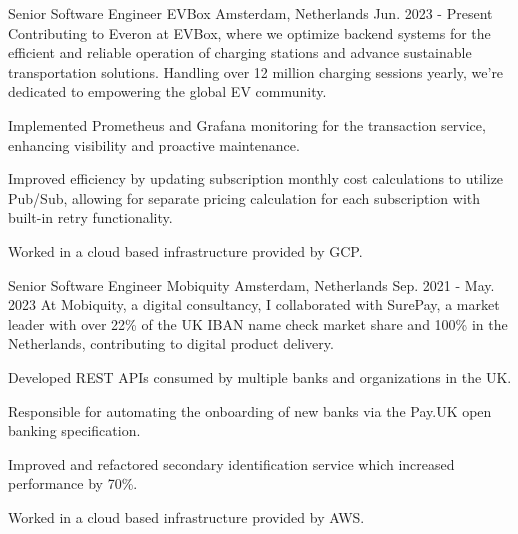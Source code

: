 

\begin{cventries}
  \cventry
  {Senior Software Engineer} %
  {EVBox} %
  {Amsterdam, Netherlands} %
  {Jun. 2023 - Present} %
  {
    Contributing to Everon at EVBox, where we optimize backend systems for the efficient and reliable operation of charging stations and advance sustainable transportation solutions. Handling over 12 million charging sessions yearly, we're dedicated to empowering the global EV community.
  }
  {
    \begin{cvitems} %
      \item {Implemented Prometheus and Grafana monitoring for the transaction service, enhancing visibility and proactive maintenance.}
      \item {Improved efficiency by updating subscription monthly cost calculations to utilize Pub/Sub, allowing for separate pricing calculation for each subscription with built-in retry functionality.}
      \item {Worked in a cloud based infrastructure provided by GCP.}
    \end{cvitems}
  }

  \cventry
    {Senior Software Engineer} %
    {Mobiquity} %
    {Amsterdam, Netherlands} %
    {Sep. 2021 - May. 2023} %
    {
      At Mobiquity, a digital consultancy, I collaborated with SurePay, a market leader with over 22\% of the UK IBAN name check market share and 100\% in the Netherlands, contributing to digital product delivery.
    }
    {
      \begin{cvitems} %
        \item {Developed REST APIs consumed by multiple banks and organizations in the UK.}
        \item {Responsible for automating the onboarding of new banks via the Pay.UK open banking specification.}
        \item {Improved and refactored secondary identification service which increased performance by 70\%.}
        \item {Worked in a cloud based infrastructure provided by AWS.}
      \end{cvitems}
    }


\end{cventries}

